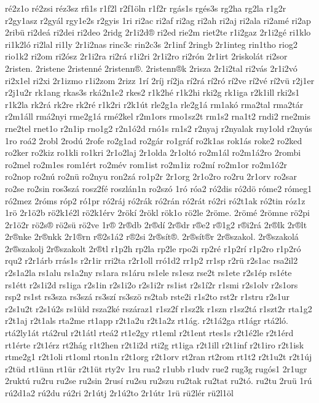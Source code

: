 {ré2z1o
ré2zsi
réz3sz
rfi1s
r1f2l
r2f1öln
r1f2r
rgás1s
rgés3s
rg2ha
rg2la
r1g2r
r2gy1asz
r2gyál
rgy1e2s
r2gyis
1ri
ri2ac
ri2af
ri2ag
ri2ah
ri2aj
ri2ala
ri2amé
ri2ap
2ribü
ri2deá
ri2dei
ri2deo
2ridg
2r1i2d®
ri2ed
rie2m
riet2te
r1i2gaz
2r1i2gé
ri1klo
ri1k2ló
ri2lal
ri1ly
2r1i2nas
rinc3c
rin2c3s
2r1inf
2ringb
2r1integ
rin1tho
riog2
rio1k2
ri2om
ri2ósz
2r1i2ra
ri2rá
r1i2ri
2r1i2ro
ri2rón
2r1irt
2riskolát
ri2sor
2risten.
2ristene
2ristenné
2ristenn®.
2ristenn®k
2risza
2r1i2tal
ri2vás
2r1i2vó
ri2x1el
ri2xi
2r1izmo
r1i2zom
2rizz
1rí
2ríj
rí2ja
rí2rá
rí2ró
rí2ve
rí2vé
rí2vü
r2j1er
r2j1u2r
rk1ang
rkas3s
rká2n1e2
rkes2
r1k2hé
r1k2hi
rki2g
rk1iga
r2k1ill
rki2s1
r1k2la
rk2rá
rk2re
rk2ré
r1k2ri
r2k1út
rle2g1a
rle2g1á
rm1akó
rma2tal
rma2tár
r2m1áll
rmá2nyi
rme2g1á
rmé2kel
r2m1ors
rmo1sz2t
rm1s2
rna1t2
rndi2
rne2mis
rne2tel
rnet1o
r2n1ip
rno1g2
r2n1ó2d
rnó1s
rn1s2
r2nyaj
r2nyalak
rny1old
r2nyús
1ro
roá2
2robl
2rodú
2rofe
ro2g1ad
ro2gár
ro1gráf
ro2k1as
rok1ás
roke2
ro2ked
ro2ker
ro2kiz
ro1kli
ro1kri
2r1o2laj
2r1olda
2r1oltó
ro2m1ál
ro2m1á2ro
2rombi
ro2mel
ro2m1es
rom1ért
ro2mév
rom1ist
ro2m1iz
ro2mí
ro2m1or
ro2m1ó2r
ro2nop
ro2nú
ro2nü
ro2nyu
ron2zá
ro1p2r
2r1org
2r1o2ro
ro2ru
2r1orv
ro2sar
ro2se
ro2sin
ros3szá
rosz2fé
roszlán1n
ro2szó
1ró
róa2
ró2dis
ró2dö
róme2
rómeg1
ró2mez
2róms
róp2
ró1pr
ró2ráj
ró2rák
ró2rán
ró2rát
ró2ri
ró2t1ak
ró2tin
róz1z
1rö
2r1ö2b
rö2k1é2l
rö2k1érv
2rökí
2rökl
rök1o
rö2le
2röme.
2römé
2römne
rö2pi
2r1ö2r
rö2s®
rö2sü
rö2ve
1r®
2r®db
2r®dí
2r®dr
r®e2
r®1g2
r®i2rá
2r®lk
2r®lt
2r®nke
2r®nkk
2r1®rn
r®2s1á2
r®2si
2r®sít®.
2r®sít®r
2r®szakol.
2r®szakolá
2r®szakolj
2r®szakolt
2r®tl
r1p2h
rp2la
rp2le
rpo2i
rp2ré
r1p2rí
r1p2ro
r1p2ró
rqu2
r2r1árb
rrás1s
r2r1ir
rri2ta
r2r1oll
rró1d2
rr1p2
rr1sp
r2rü
r2s1ac
rsa2il2
r2s1a2la
rs1alu
rs1a2ny
rs1ara
rs1áru
rs1ele
rs1esz
rse2t
rs1ete
r2s1ép
rs1éte
rs1étt
r2s1i2d
rs1iga
r2s1in
r2s1i2o
r2s1i2r
rs1ist
r2s1í2r
r1smi
r2s1olv
r2s1ors
rsp2
rs1st
rs3sza
rs3szá
rs3szí
rs3szö
rs2tab
rste2i
r1s2to
rst2r
r1stru
r2s1ur
r2s1u2t
r2s1ú2s
rs1üld
rsza2ké
rszáraz1
r1sz2f
r1sz2k
r1szn
r1sz2tá
r1szt2r
rta1g2
r2t1aj
r2t1als
rta2me
rt1app
r2t1a2u
r2t1a2z
rt1ág.
r2t1á2ga
rt1ágr
rtá2ló.
rtá2ly1át
rtá2rul
r2t1átl
rteá2
rt1e2gy
rt1eml
r2t1ent
rtes1s
r2t1é2le
r2t1érd
rt1érte
r2t1érz
rt2hág
r1t2hen
r2t1i2d
rti2g
rt1iga
r2t1ill
r2t1inf
r2t1iro
r2t1isk
rtme2g1
r2t1oli
rt1oml
rton1n
r2t1org
r2t1orv
rt2ran
rt2rom
rt1t2
r2t1u2t
r2t1új
r2tüd
rt1ünn
rt1ür
r2t1üt
rty2v
1ru
rua2
r1ubb
r1udv
rue2
rug3g
rugós1
2r1ugr
2ruktú
ru2ru
ru2se
ru2sin
2rusí
ru2su
ru2szu
ru2tak
ru2tat
ru2tó.
ru2tu
2ruü
1rú
rú2d1a2
rú2du
rú2ri
2r1útj
2r1ú2to
2r1útr
1rü
rü2lér
rü2l1öl
}
